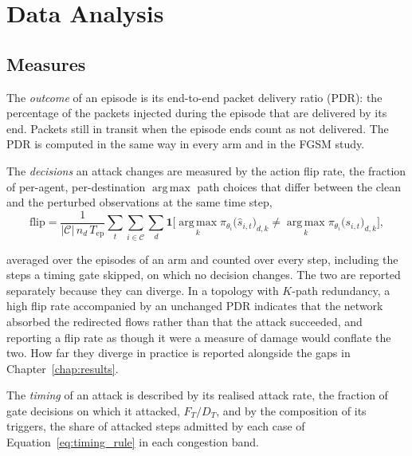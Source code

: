 \section{Data Analysis}
\label{sec:data_analysis}

\subsection{Measures}
\label{subsec:analysis_measures}

The \emph{outcome} of an episode is its end-to-end packet delivery ratio (PDR): the
percentage of the packets injected during the episode that are delivered by its end.
Packets still in transit when the episode ends count as not delivered. The PDR is
computed in the same way in every arm and in the FGSM study.

The \emph{decisions} an attack changes are measured by the action flip rate, the
fraction of per-agent, per-destination $\operatorname{arg\,max}$ path choices that differ between the
clean and the perturbed observations at the same time step,
\begin{equation}
  \mathrm{flip}
  = \frac{1}{|\mathcal{C}|\, n_d\, T_{\text{ep}}}
    \sum_{t}\sum_{i \in \mathcal{C}}\sum_{d}
    \mathbf{1}\Big[
      \operatorname*{arg\,max}_k \pi_{\theta_i}\big(\hat{s}_{i,t}\big)_{d,k}
      \neq
      \operatorname*{arg\,max}_k \pi_{\theta_i}\big(s_{i,t}\big)_{d,k}
    \Big],
  \label{eq:flip_rate}
\end{equation}

\noindent averaged over the episodes of an arm and counted over every step, including
the steps a timing gate skipped, on which no decision changes. The two are reported
separately because they can diverge. In a topology with $K$-path redundancy, a high flip
rate accompanied by an unchanged PDR indicates that the network absorbed the redirected
flows rather than that the attack succeeded, and reporting a flip rate as though it were
a measure of damage would conflate the two. How far they diverge in practice is reported
alongside the gaps in Chapter~\ref{chap:results}.

The \emph{timing} of an attack is described by its realised attack rate, the fraction of
gate decisions on which it attacked, $F_T / D_T$, and by the composition of its triggers,
the share of attacked steps admitted by each case of Equation~\eqref{eq:timing_rule} in
each congestion band.

